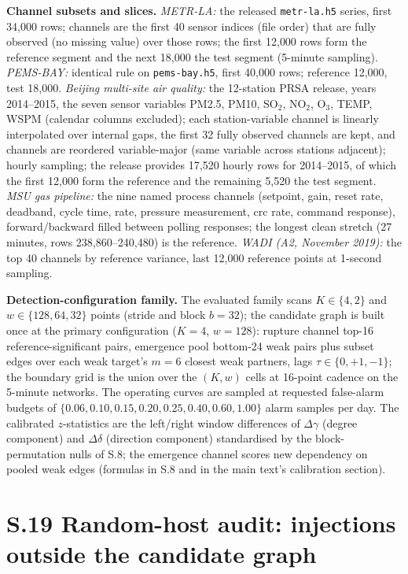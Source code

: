 \documentclass[11pt,a4paper]{article}
\begin{document}
\medskip
\noindent\textbf{Channel subsets and slices.}
\emph{METR-LA:} the released \texttt{metr-la.h5} series, first 34{,}000
rows; channels are the first 40 sensor indices (file order) that are
fully observed (no missing value) over those rows; the first 12{,}000
rows form the reference segment and the next 18{,}000 the test segment
(5-minute sampling).
\emph{PEMS-BAY:} identical rule on \texttt{pems-bay.h5}, first 40{,}000
rows; reference 12{,}000, test 18{,}000.
\emph{Beijing multi-site air quality:} the 12-station PRSA release,
years 2014--2015, the seven sensor variables
PM2.5, PM10, SO$_2$, NO$_2$, O$_3$, TEMP, WSPM (calendar columns
excluded); each station-variable channel is linearly interpolated over
internal gaps, the first 32 fully observed channels are kept, and
channels are reordered variable-major (same variable across stations
adjacent); hourly sampling; the release provides 17{,}520 hourly rows
for 2014--2015, of which the first 12{,}000 form the reference and the
remaining 5{,}520 the test segment.
\emph{MSU gas pipeline:} the nine named process channels (setpoint,
gain, reset rate, deadband, cycle time, rate, pressure measurement, crc
rate, command response), forward/backward filled between polling
responses; the longest clean stretch (27 minutes, rows
238{,}860--240{,}480) is the reference.
\emph{WADI (A2, November 2019):} the top 40 channels by reference
variance, last 12{,}000 reference points at 1-second sampling.

\medskip
\noindent\textbf{Detection-configuration family.} The evaluated family
scans $K\in\{4,2\}$ and $w\in\{128,64,32\}$ points (stride and block
$b=32$); the candidate graph is built once at the primary configuration
($K{=}4$, $w{=}128$): rupture channel top-16 reference-significant
pairs, emergence pool bottom-24 weak pairs plus subset edges over each
weak target's $m{=}6$ closest weak partners, lags
$\tau\in\{0,+1,-1\}$; the boundary grid is the union over the
$(K,w)$ cells at 16-point cadence on the 5-minute networks. The
operating curves are sampled at requested false-alarm budgets of
$\{0.06,0.10,0.15,0.20,0.25,0.40,0.60,1.00\}$ alarm samples per day.
The calibrated $z$-statistics are the left/right window differences of
$\Delta\gamma$ (degree component) and $\Delta\delta$ (direction
component) standardised by the block-permutation nulls of S.8; the
emergence channel scores new dependency on pooled weak edges (formulas
in S.8 and in the main text's calibration section).

\section*{S.19 Random-host audit: injections outside the candidate graph}
\end{document}
